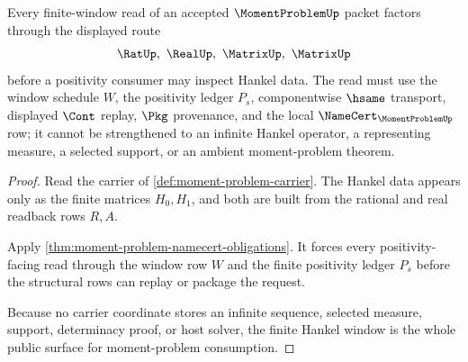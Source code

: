 \begin{theorem}
\label{thm:moment-problem-finite-hankel-window}
Every finite-window read of an accepted $\MomentProblemUp$ packet factors through the displayed route
$$
\RatUp,\ \RealUp,\ \MatrixUp,\ \MatrixUp
$$
before a positivity consumer may inspect Hankel data. The read must use the window schedule $W$, the positivity ledger $P_s$, componentwise $\hsame$ transport, displayed $\Cont$ replay, $\Pkg$ provenance, and the local $\NameCert_{\MomentProblemUp}$ row; it cannot be strengthened to an infinite Hankel operator, a representing measure, a selected support, or an ambient moment-problem theorem.
\end{theorem}
\begin{proof}
Read the carrier of \autoref{def:moment-problem-carrier}. The Hankel data appears only as the finite matrices $H_0,H_1$, and both are built from the rational and real readback rows $R,A$.

Apply \autoref{thm:moment-problem-namecert-obligations}. It forces every positivity-facing read through the window row $W$ and the finite positivity ledger $P_s$ before the structural rows can replay or package the request.

Because no carrier coordinate stores an infinite sequence, selected measure, support, determinacy proof, or host solver, the finite Hankel window is the whole public surface for moment-problem consumption.
\end{proof}


\begin{closurestatus}{\MomentProblemUp}
  \theoryclosure{\seedClosure}
  \formalstatus{\unformalizedV}
\end{closurestatus}
